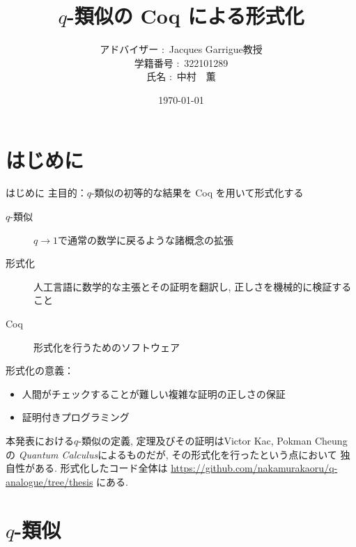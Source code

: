 \documentclass[dvipdfmx,cjk]{beamer}
\theoremstyle{mystyle}
\newcommand{\0}{\textbf{0}}
\begin{document}
\title{$q$-類似の Coq による形式化}
\author[中村　薫]{アドバイザー $\colon$ Jacques Garrigue教授\\
           学籍番号 $\colon$ 322101289\\
           氏名 $\colon$ 中村　薫}
\date{\today}
\maketitle
\begin{frame}
\tableofcontents
\end{frame}
\section{はじめに}

\begin{frame}
  \tableofcontents[currentsection] 
\end{frame}

\begin{frame}[fragile]{はじめに}
	主目的：$q$-類似の初等的な結果を Coq を用いて形式化する
 	\begin{description}
 		\item[$q$-類似] $q \to 1$で通常の数学に戻るような諸概念の拡張
		\item[形式化] 人工言語に数学的な主張とその証明を翻訳し, 
		正しさを機械的に検証すること
		\item[Coq] 形式化を行うためのソフトウェア
	\end{description}
	形式化の意義：
	\begin{itemize}
		\item 人間がチェックすることが難しい複雑な証明の正しさの保証
		\item 証明付きプログラミング
	\end{itemize}
	本発表における$q$-類似の定義, 定理及びその証明はVictor Kac, Pokman Cheungの
	{\it Quantum Calculus}\cite{Kac}によるものだが, その形式化を行ったという点において
	独自性がある. 形式化したコード全体は
	\url{https://github.com/nakamurakaoru/q-analogue/tree/thesis}\cite{coq qana}
	にある.
\end{frame}
\section{$q$-類似}
\end{document}

